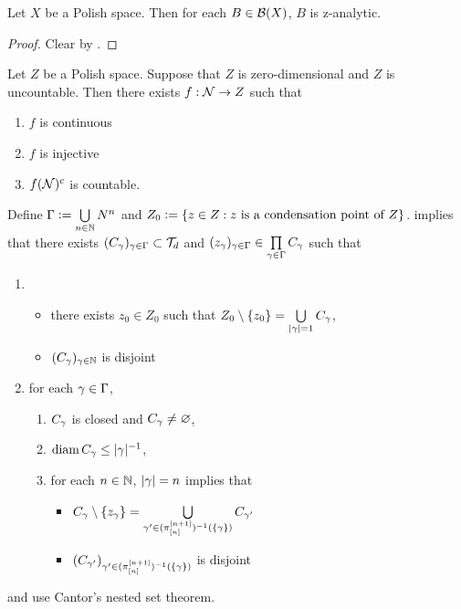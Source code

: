 \documentclass{book}
\begin{document}
	\begin{ex} 
		Let $X$ be a Polish space. Then for each $B \in \mathcal{B}(X)$, $B$ is z-analytic.
	\end{ex}
	
	\begin{proof}
		Clear by .
	\end{proof}
	
	
	
	
	
	
	
	
	\begin{ex} 
		Let $Z$ be a Polish space. Suppose that $Z$ is zero-dimensional and $Z$ is uncountable. Then there exists $f: \mathcal{N} \rightarrow Z$ such that 
		\begin{enumerate}
			\item $f$ is continuous 
			\item $f$ is injective
			\item $f(\mathcal{N})^c$ is countable.
		\end{enumerate} 
		 Define $\Gamma \vcentcolon= \bigcup\limits_{n \in \mathbb{N}} N^n$ and $Z_0 \vcentcolon= \{z \in Z: \text{$z$ is a condensation point of $Z$}\}$.  implies that there exists $(C_{\gamma})_{\gamma \in \Gamma} \subset \mathcal{T}_d$ and $(z_{\gamma})_{\gamma \in \Gamma} \in \prod\limits_{\gamma \in \Gamma} C_{\gamma}$ such that 
		\begin{enumerate}
			\item \begin{itemize}
				\item there exists $z_0 \in Z_0$ such that $Z_0 \setminus \{z_0\} = \bigcup\limits_{|\gamma| = 1} C_{\gamma}$,
				\item $(C_{\gamma})_{{\gamma} \in \mathbb{N}}$ is disjoint
			\end{itemize}
			\item for each $\gamma \in \Gamma$,
			\begin{enumerate}
				\item $C_{\gamma}$ is closed and $C_{\gamma} \neq \varnothing$,
				\item $\operatorname{\text{diam}} C_{\gamma} \leq |\gamma|^{-1}$,
				\item for each $n \in \mathbb{N}$, $|\gamma| = n$ implies that 
				\begin{itemize}
					\item $C_{\gamma} \setminus \{z_{\gamma}\} = \bigcup\limits_{\gamma' \in (\pi^{[n+1]}_{[n]})^{-1}(\{\gamma\})} C_{\gamma'}$
					\item $(C_{\gamma'})_{\gamma' \in (\pi^{[n+1]}_{[n]})^{-1}(\{\gamma\})}$ is disjoint
				\end{itemize}
			\end{enumerate} 
		\end{enumerate} 
		and use Cantor’s nested set theorem.
	\end{ex}
	
\end{document}

